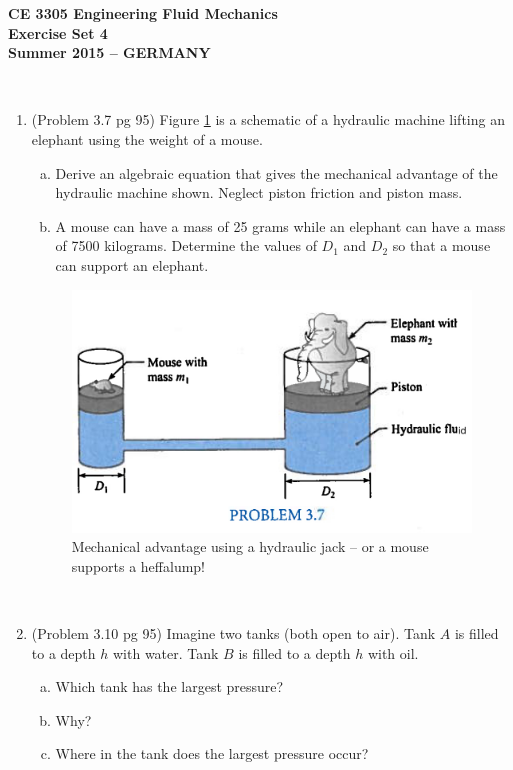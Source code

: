 \documentclass[12pt]{article}
\begin{document}
\begingroup
\begin{center}
{\textbf{{ CE 3305 Engineering Fluid Mechanics} \\ Exercise Set 4 \\ Summer 2015 -- GERMANY} }
\end{center}
\endgroup
\begingroup
~\newline

\begin{enumerate}
\item (Problem 3.7 pg 95)
Figure \ref{fig:MouseElephant} is a schematic of a hydraulic machine lifting an elephant using the weight of a mouse.
\begin{enumerate}[a)]
\item Derive an algebraic equation that gives the mechanical advantage of the hydraulic machine shown.  
Neglect piston friction and piston mass.
\item A mouse can have a mass of 25 grams while an elephant can have a mass of 7500 kilograms.   Determine the values of $D_1$ and $D_2$ so that a mouse can support an elephant.
\end{enumerate}
\begin{figure}[htbp] %
   \centering
   \includegraphics[width=5in]{MouseElephant.jpg} 
   \caption{Mechanical advantage using a hydraulic jack -- or a mouse supports a heffalump!}
   \label{fig:MouseElephant}
\end{figure}
\clearpage
~
\clearpage
\item (Problem 3.10 pg 95)
Imagine two tanks (both open to air).  Tank $A$ is filled to a depth $h$ with water.
Tank $B$ is filled to a depth $h$ with oil.
\begin{enumerate}[a)]
\item Which tank has the largest pressure?
\item Why?
\item Where in the tank does the largest pressure occur?
\end{enumerate}
\end{enumerate}
\end{document}
